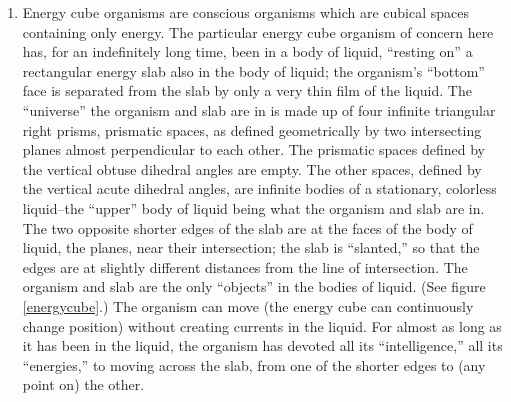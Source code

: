 \begin{enumerate}[wide, nosep, itemsep=0.5em]
\item Energy cube organisms are conscious organisms which are cubical 
spaces containing only energy. The particular energy cube organism of 
concern here has, for an indefinitely long time, been in a body of liquid, 
\enquote{resting on} a rectangular energy slab also in the body of liquid; the 
organism's \enquote{bottom} face is separated from the slab by only a very thin film 
of the liquid. The \enquote{universe} the organism and slab are in is made up of four 
infinite triangular right prisms, prismatic spaces, as defined geometrically by 
two intersecting planes almost perpendicular to each other. The prismatic 
spaces defined by the vertical obtuse dihedral angles are empty. The other 
spaces, defined by the vertical acute dihedral angles, are infinite bodies of a 
stationary, colorless liquid--the \enquote{upper} body of liquid being what the 
organism and slab are in. The two opposite shorter edges of the slab are at 
the faces of the body of liquid, the planes, near their intersection; the slab is 
\enquote{slanted,} so that the edges are at slightly different distances from the line 
of intersection. The organism and slab are the only \enquote{objects} in the bodies 
of liquid. (See figure \ref{energycube}.) The organism can move (the energy cube can 
continuously change position) without creating currents in the liquid. For 
almost as long as it has been in the liquid, the organism has devoted all its 
\enquote{intelligence,} all its \enquote{energies,} to moving across the slab, from one of the 
shorter edges to (any point on) the other. 


\end{enumerate}
